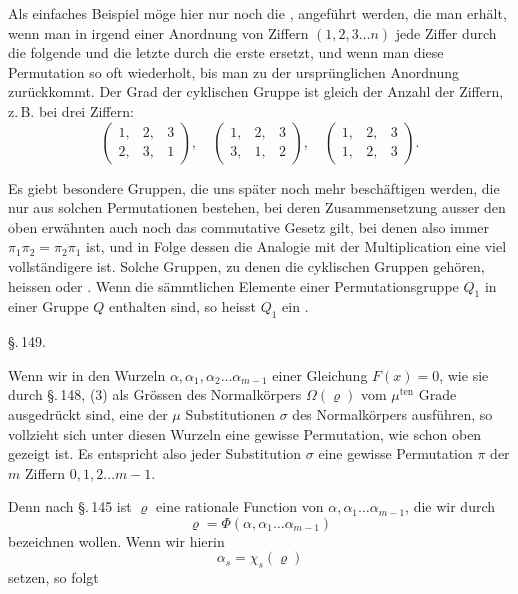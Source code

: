 
Als einfaches Beispiel möge hier nur noch die , angeführt werden, die man
erhält, wenn man in irgend einer Anordnung von Ziffern $(1, 2, 3
\ldots n)$ jede Ziffer durch die folgende und die letzte durch die
erste ersetzt, und wenn man diese Permutation so oft wiederholt, bis
man zu der ursprünglichen Anordnung zurückkommt. Der Grad der
cyklischen Gruppe ist gleich der Anzahl der Ziffern, z.\,B. bei drei
Ziffern:
\[
\begin{pmatrix} 1, & 2, & 3 \\ 2, & 3, & 1 \end{pmatrix}, \quad
\begin{pmatrix} 1, & 2, & 3 \\ 3, & 1, & 2 \end{pmatrix}, \quad
\begin{pmatrix} 1, & 2, & 3 \\ 1, & 2, & 3 \end{pmatrix}.
\]

Es giebt besondere Gruppen, die uns später noch mehr beschäftigen
werden, die nur aus solchen Permutationen bestehen, bei deren
Zusammensetzung ausser den oben erwähnten auch noch das commutative
Gesetz gilt, bei denen also immer $\pi_1 \pi_2 = \pi_2 \pi_1$ ist, und
in Folge dessen die Analogie mit der Multiplication eine viel
vollständigere ist. Solche Gruppen, zu denen die cyklischen Gruppen
gehören, heissen  oder
. Wenn die sämmtlichen Elemente einer
Permutationsgruppe $Q_1$ in einer Gruppe $Q$ enthalten sind, so heisst
$Q_1$ ein .

\begin{center}
\S.\,149.

\end{center}

Wenn wir in den Wurzeln $\alpha, \alpha_1, \alpha_2 \ldots
\alpha_{m-1}$ einer Gleichung $F(x) = 0$, wie sie durch \S.\,148, (3)
als Grössen des Normalkörpers $\Omega(\varrho)$ vom $\mu^{\mathrm{ten}}$
Grade ausgedrückt sind, eine der $\mu$ Substitutionen $\sigma$ des
Normalkörpers ausführen, so vollzieht sich unter diesen Wurzeln eine
gewisse Permutation, wie schon oben gezeigt ist. Es entspricht also
jeder Substitution $\sigma$ eine gewisse Permutation $\pi$ der $m$
Ziffern $0, 1, 2 \ldots m-1$. 

Denn nach \S.\,145 ist $\varrho$ eine rationale Function von $\alpha,
\alpha_1 \ldots \alpha_{m-1}$, die wir durch
\[
\varrho = \Phi(\alpha, \alpha_1 \ldots \alpha_{m-1})
\]
bezeichnen wollen. Wenn wir hierin
\[
\alpha_s = \chi_s(\varrho)
\]
setzen, so folgt

